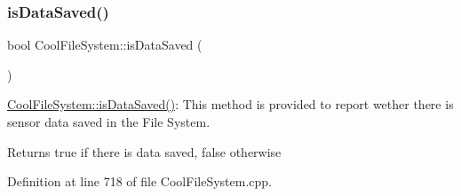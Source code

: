 \subsubsection{\texorpdfstring{is\+Data\+Saved()}{isDataSaved()}}
{\footnotesize\ttfamily bool Cool\+File\+System\+::is\+Data\+Saved (\begin{DoxyParamCaption}{ }\end{DoxyParamCaption})}

\hyperlink{class_cool_file_system_a5a7eaeea7a9fbf8aaef651d862fa3b5b}{Cool\+File\+System\+::is\+Data\+Saved()}\+: This method is provided to report wether there is sensor data saved in the File System.

\begin{DoxyReturn}{Returns}
true if there is data saved, false otherwise 
\end{DoxyReturn}


Definition at line 718 of file Cool\+File\+System.\+cpp.


